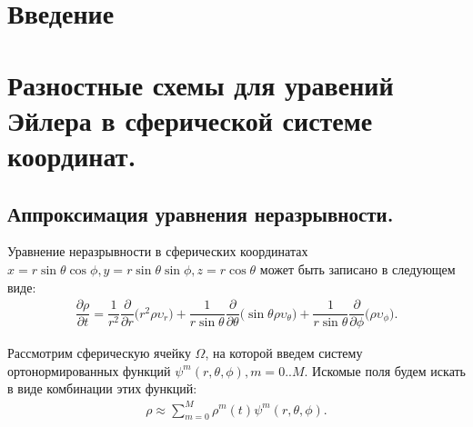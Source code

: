 \documentclass[12pt, a4paper, fleqn]{extreport}
\begin{document}
	
	\newcommand{\round}[1]{\stackrel{o}{#1}}
	
	\tableofcontents
	\clearpage
	
	\chapter*{Введение}
	
	
	
	
	\chapter{Разностные схемы для уравений Эйлера в сферической системе координат.}
	
	\section{Аппроксимация уравнения неразрывности.}
	
	Уравнение неразрывности в сферических координатах
	$x = r\sin\theta\cos\phi, y = r\sin\theta\sin\phi, z = r\cos\theta$
	может быть записано в следующем виде:
	\begin{equation*}
	\begin{split}
		\dfrac{\partial \rho}{\partial t}
			= \dfrac{1}{r^2}\dfrac{\partial}{\partial r}\bigg(r^2\rho\upsilon_r\bigg)
			+ \dfrac{1}{r\sin\theta}\dfrac{\partial}{\partial\theta}\bigg(\sin\theta\rho\upsilon_\theta\bigg)
			+ \dfrac{1}{r\sin\theta}\dfrac{\partial}{\partial\phi}\bigg(\rho\upsilon_\phi\bigg).
	\end{split}
	\end{equation*}
	
	Рассмотрим сферическую ячейку $\Omega$,
	на которой введем систему ортонормированных функций 
	$\psi^m(r, \theta, \phi), m=0..M$.
	Искомые поля будем искать в виде комбинации этих функций:
	\begin{equation*}
	\begin{split}
		\rho \approx \sum\limits_{m=0}^{M} \rho^m(t)\psi^m(r, \theta, \phi).
	\end{split}
	\end{equation*}
	
\end{document}
